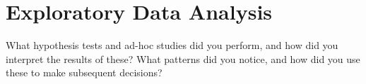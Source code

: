 \section{Exploratory Data Analysis}
\label{sec:datAnalisys}
What hypothesis tests and ad-hoc studies did you perform,
and how did you interpret the results of these? What patterns did you notice, and how
did you use these to make subsequent decisions?